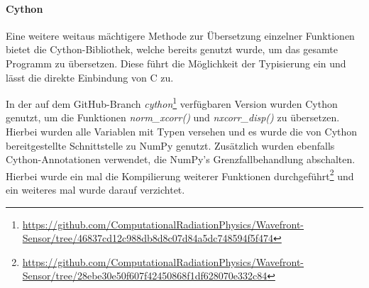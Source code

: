 \paragraph{Cython}

Eine weitere weitaus mächtigere Methode zur Übersetzung einzelner Funktionen bietet die Cython-Bibliothek, welche bereits genutzt wurde, um das gesamte Programm zu übersetzen. Diese führt die Möglichkeit der Typisierung ein und lässt die direkte Einbindung von C zu. 

In der auf dem GitHub-Branch \textit{cython}\footnote{\url{https://github.com/ComputationalRadiationPhysics/Wavefront-Sensor/tree/46837cd12c988db8d8c07d84a5dc748594f5f474}} verfügbaren Version wurden Cython genutzt, um die Funktionen \textit{norm\_xcorr()} und \textit{nxcorr\_disp()} zu übersetzen. Hierbei wurden alle Variablen mit Typen versehen und es wurde die von Cython bereitgestellte Schnittstelle zu NumPy genutzt. Zusätzlich wurden ebenfalls Cython-Annotationen verwendet, die NumPy's Grenzfallbehandlung abschalten. Hierbei wurde ein mal die Kompilierung weiterer Funktionen durchgeführt\footnote{\url{https://github.com/ComputationalRadiationPhysics/Wavefront-Sensor/tree/28ebe30e50f607f42450868f1df628070e332c84}} und ein weiteres mal wurde darauf verzichtet. 
